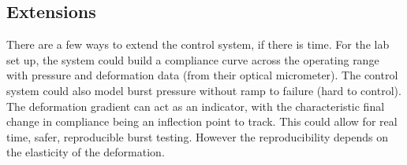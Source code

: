 \documentclass[10pt, a4paper]{article}
\begin{document}
\subsection{Extensions}
There are a few ways to extend the control system, if there is time. For the lab set up, the system could build a compliance curve across the operating range with pressure and deformation data (from their optical micrometer). The control system could also model burst pressure without ramp to failure (hard to control). The deformation gradient can act as an indicator, with the characteristic final change in compliance being an inflection point to track. This could allow for real time, safer, reproducible burst testing. However the reproducibility depends on the elasticity of the deformation.
\end{document}
